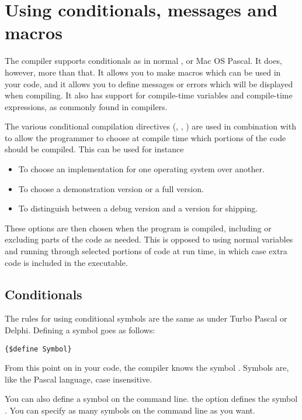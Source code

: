 \chapter{Using conditionals, messages and macros}
\label{ch:CondMessageMacro}
The \fpc compiler supports conditionals as in normal \tp, \delphi or Mac OS
Pascal. It does, however, more than that. It allows you to make macros which can be used in
your code, and it allows you to define messages or errors which will be
displayed when compiling. It also has support for compile-time variables and
compile-time expressions, as commonly found in \macos compilers.

The various conditional compilation directives (, ,
) are used in combination with 
to allow the programmer to choose at compile time which portions 
of the code should be compiled.  This can be used for instance
\begin{itemize}
\item To choose an implementation for one operating system over another.
\item To choose a demonstration version or a full version.
\item To distinguish between a debug version and a version for shipping.
\end{itemize}
These options are then chosen when the program is compiled, including or
excluding parts of the code as needed. This is opposed to using normal 
variables and running through selected portions of code at run time,
in which case extra code is included in the executable.

\section{Conditionals}
\label{se:Conditionals}
The rules for using conditional symbols are the same as under Turbo Pascal
or Delphi. Defining a symbol goes as follows:
\begin{verbatim}
{$define Symbol}
\end{verbatim}
From this point on in your code, the compiler knows the symbol .
Symbols are, like the Pascal language, case insensitive.

You can also define a symbol on the command line. the  option
defines the symbol . You can specify as many symbols on the
command line as you want.

